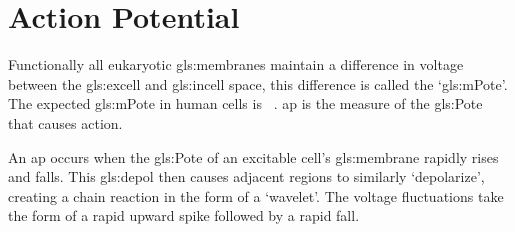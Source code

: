 \documentclass[class={myRUCProject}, crop=false]{standalone}
\begin{document}



\endgroup

\section{Action Potential}\label{sec:ap}
Functionally all eukaryotic \glspl{gls:membrane} maintain a difference in voltage between the \gls{gls:excell} and \gls{gls:incell} space, this difference is called the `\gls{gls:mPote}'. The expected \gls{gls:mPote} in human cells is ~\cite{}.
\gls{ap} is the measure of the \gls{gls:Pote} that causes action.

An \gls{ap} occurs when the \gls{gls:Pote} of an excitable cell's \gls{gls:membrane} rapidly rises and falls. This \gls{gls:depol} then causes adjacent regions to similarly `depolarize', creating a chain reaction in the form of a `wavelet'.
The voltage fluctuations take the form of a rapid upward spike followed by a rapid fall.
\end{document}
